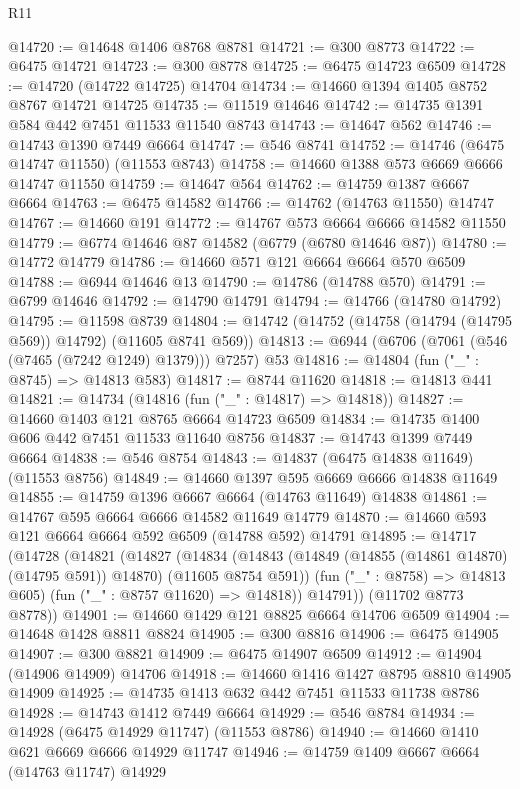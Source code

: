 \begin{lexlean}{R11}
\begin{coremodule}
{{{{{{{{{{{{{{{{{{{{{{{{{{{{{{{{{{{{{{{{{{{{{{{{{{{{{{{{{{{{{{{{{{{{{{{{{{{{{{{{{{@14720 := @14648 @1406 @8768 @8781
@14721 := @300 @8773
@14722 := @6475 @14721
@14723 := @300 @8778
@14725 := @6475 @14723 @6509
@14728 := @14720 (@14722 @14725) @14704
@14734 := @14660 @1394 @1405 @8752 @8767 @14721 @14725
@14735 := @11519 @14646
@14742 := @14735 @1391 @584 @442 @7451 @11533 @11540 @8743
@14743 := @14647 @562
@14746 := @14743 @1390 @7449 @6664
@14747 := @546 @8741
@14752 := @14746 (@6475 @14747 @11550) (@11553 @8743)
@14758 := @14660 @1388 @573 @6669 @6666 @14747 @11550
@14759 := @14647 @564
@14762 := @14759 @1387 @6667 @6664
@14763 := @6475 @14582
@14766 := @14762 (@14763 @11550) @14747
@14767 := @14660 @191
@14772 := @14767 @573 @6664 @6666 @14582 @11550
@14779 := @6774 @14646 @87 @14582 (@6779 (@6780 @14646 @87))
@14780 := @14772 @14779
@14786 := @14660 @571 @121 @6664 @6664 @570 @6509
@14788 := @6944 @14646 @13
@14790 := @14786 (@14788 @570)
@14791 := @6799 @14646
@14792 := @14790 @14791
@14794 := @14766 (@14780 @14792)
@14795 := @11598 @8739
@14804 := @14742 (@14752 (@14758 (@14794 (@14795 @569)) @14792) (@11605 @8741 @569))
@14813 := @6944 (@6706 (@7061 (@546 (@7465 (@7242 @1249) @1379))) @7257) @53
@14816 := @14804 (fun ("_" : @8745) => @14813 @583)
@14817 := @8744 @11620
@14818 := @14813 @441
@14821 := @14734 (@14816 (fun ("_" : @14817) => @14818))
@14827 := @14660 @1403 @121 @8765 @6664 @14723 @6509
@14834 := @14735 @1400 @606 @442 @7451 @11533 @11640 @8756
@14837 := @14743 @1399 @7449 @6664
@14838 := @546 @8754
@14843 := @14837 (@6475 @14838 @11649) (@11553 @8756)
@14849 := @14660 @1397 @595 @6669 @6666 @14838 @11649
@14855 := @14759 @1396 @6667 @6664 (@14763 @11649) @14838
@14861 := @14767 @595 @6664 @6666 @14582 @11649 @14779
@14870 := @14660 @593 @121 @6664 @6664 @592 @6509 (@14788 @592) @14791
@14895 := @14717
    (@14728
      (@14821
        (@14827
          (@14834
            (@14843 (@14849 (@14855 (@14861 @14870) (@14795 @591)) @14870) (@11605 @8754 @591))
            (fun ("_" : @8758) => @14813 @605)
            (fun ("_" : @8757 @11620) => @14818))
          @14791))
      (@11702 @8773 @8778))
@14901 := @14660 @1429 @121 @8825 @6664 @14706 @6509
@14904 := @14648 @1428 @8811 @8824
@14905 := @300 @8816
@14906 := @6475 @14905
@14907 := @300 @8821
@14909 := @6475 @14907 @6509
@14912 := @14904 (@14906 @14909) @14706
@14918 := @14660 @1416 @1427 @8795 @8810 @14905 @14909
@14925 := @14735 @1413 @632 @442 @7451 @11533 @11738 @8786
@14928 := @14743 @1412 @7449 @6664
@14929 := @546 @8784
@14934 := @14928 (@6475 @14929 @11747) (@11553 @8786)
@14940 := @14660 @1410 @621 @6669 @6666 @14929 @11747
@14946 := @14759 @1409 @6667 @6664 (@14763 @11747) @14929
}}}}}}}}}}}}}}}}}}}}}}}}}}}}}}}}}}}}}}}}}}}}}}}}}}}}}}}}}}}}}}}}}}}}}}}}}}}}}}}}}}
\end{coremodule}
\end{lexlean}
